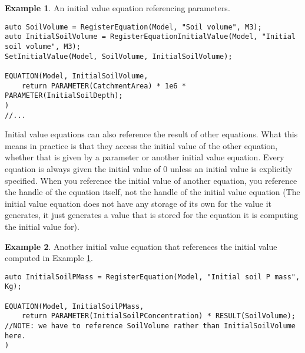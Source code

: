 \documentclass[11pt]{article}
\theoremstyle{definition}
\newtheorem{myexample}{Example}
\newenvironment{example}%
  {\begin{lrbox}{\examplebox}%
   \begin{minipage}{\dimexpr\linewidth-2\fboxsep}
   \begin{myexample}}%
  {\end{myexample}%
   \end{minipage}%
   \end{lrbox}%
   \begin{trivlist}
     \item[]\colorbox{silver}{\usebox\examplebox}
   \end{trivlist}}
\begin{document}
\begin{example}\label{ex:initialvalue}
An initial value equation referencing parameters.
\begin{lstlisting}[style=mycpp]
auto SoilVolume = RegisterEquation(Model, "Soil volume", M3);
auto InitialSoilVolume = RegisterEquationInitialValue(Model, "Initial soil volume", M3);
SetInitialValue(Model, SoilVolume, InitialSoilVolume);

EQUATION(Model, InitialSoilVolume,
	return PARAMETER(CatchmentArea) * 1e6 * PARAMETER(InitialSoilDepth);
)
//...
\end{lstlisting}
\end{example}

Initial value equations can also reference the result of other equations. What this means in practice is that they access the initial value of the other equation, whether that is given by a parameter or another initial value equation. Every equation is always given the initial value of 0 unless an initial value is explicitly specified. When you reference the initial value of another equation, you reference the handle of the equation itself, not the handle of the initial value equation (The initial value equation does not have any storage of its own for the value it generates, it just generates a value that is stored for the equation it is computing the initial value for).

\begin{example}
Another initial value equation that references the initial value computed in Example \ref{ex:initialvalue}.
\begin{lstlisting}[style=mycpp]
auto InitialSoilPMass = RegisterEquation(Model, "Initial soil P mass", Kg);

EQUATION(Model, InitialSoilPMass,
	return PARAMETER(InitialSoilPConcentration) * RESULT(SoilVolume); //NOTE: we have to reference SoilVolume rather than InitialSoilVolume here.
)
\end{lstlisting}
\end{example}
\end{document}
